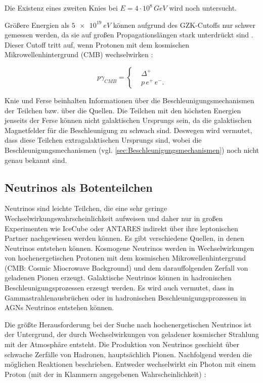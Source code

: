Die Existenz eines zweiten Knies bei $E=4\cdot 10^8\,\si{GeV}$\cite{Knie} wird noch untersucht.

Größere Energien als $\SI{5e19}{eV}$ können aufgrund des GZK-Cutoffs \cite{Greisen}\cite{ZatsepinKuzmin} nur schwer gemessen werden, da sie auf großen Propagationslängen stark unterdrückt sind . 
Dieser Cutoff tritt auf, wenn Protonen mit dem kosmischen Mikrowellenhintergrund (CMB) wechselwirken \cite{Greisen}\cite{ZatsepinKuzmin}: 

\begin{equation*}
p\gamma_{CMB}=	
\left\{
\begin{aligned}
& \Delta^+ \\
& p\, e^+ \, e^- .
\end{aligned}
\right.
\end{equation*}

Knie und Ferse beinhalten Informationen über die Beschleunigungsmechanismen der Teilchen bzw. über die Quellen.
Die Teilchen mit den höchsten Energien jenseits der Ferse können nicht galaktischen Ursprungs sein, da die galaktischen Magnetfelder für die Beschleunigung zu schwach sind. 
Deswegen wird vermutet, dass diese Teilchen extragalaktischen Ursprungs sind, wobei die Beschleunigungsmechanismen (vgl. \autoref{sec:Beschleunigungsmechanismen}) noch nicht genau bekannt sind.

\subsection{Neutrinos als Botenteilchen}
Neutrinos sind leichte Teilchen, die eine sehr geringe Wechselwirkungswahrscheinlichkeit aufweisen und daher nur in großen Experimenten wie IceCube \cite{Icecube} oder ANTARES \cite{ANTARES} indirekt über ihre leptonischen Partner nachgewiesen werden können.
Es gibt verschiedene Quellen, in denen Neutrinos entstehen können.
Kosmogene Neutrinos werden in Wechselwirkungen von hochenergetischen Protonen mit dem kosmischen Mikrowellenhintergrund (CMB: Cosmic Miocrowave Background) und dem darauffolgenden Zerfall von geladenen Pionen erzeugt.
Galaktische Neutrinos können in hadronischen Beschleunigungsprozessen erzeugt werden.
Es wird auch vermutet, dass in Gammastrahlenausbrüchen oder in hadronischen Beschleunigungsprozessen in AGNs Neutrinos entstehen können.

Die größte Herausforderung bei der Suche nach hochenergetischen Neutrinos ist der Untergrund, der durch Wechselwirkungen von geladener kosmischer Strahlung mit der Atmosphäre entsteht.
Die Produktion von Neutrinos geschieht über schwache Zerfälle von Hadronen, hauptsächlich Pionen.
Nachfolgend werden die möglichen Reaktionen beschrieben.
Entweder wechselwirkt ein Photon mit einem Proton (mit der in Klammern angegebenen Wahrscheinlichkeit) \cite{DissBecker}:

